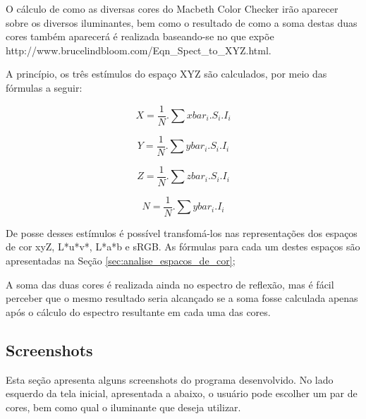 \par
O cálculo de como as diversas cores do Macbeth Color Checker irão
aparecer sobre os diversos iluminantes, bem como o resultado de como a soma
destas duas cores também aparecerá é realizada baseando-se no que expõe
{http://www.brucelindbloom.com/Eqn_Spect_to_XYZ.html}.

\par
A princípio, os três estímulos do espaço XYZ são calculados, por meio das
fórmulas a seguir:

\begin{equation}\label{eq:XYZfromSpectrum_X}
X=\frac{1}{N}.\sum{xbar_i.S_i.I_i}
\end{equation}

\begin{equation}\label{eq:XYZfromSpectrum_Y}
Y=\frac{1}{N}.\sum{ybar_i.S_i.I_i}
\end{equation}

\begin{equation}\label{eq:XYZfromSpectrum_Z}
Z=\frac{1}{N}.\sum{zbar_i.S_i.I_i}
\end{equation}

\begin{equation}\label{eq:XYZfromSpectrum_N}
N=\frac{1}{N}.\sum{ybar_i.I_i}
\end{equation}

\par
De posse desses estímulos é possível transfomá-los nas representações dos
espaços de cor xyZ, L*u*v*, L*a*b e sRGB. As fórmulas para cada um destes
espaços são apresentadas na Seção \ref{sec:analise_espacos_de_cor};

\par
A soma das duas cores é realizada ainda no espectro de reflexão, mas é fácil
perceber que o mesmo resultado seria alcançado se a soma fosse calculada apenas
após o cálculo do espectro resultante em cada uma das cores.

\subsection{Screenshots}
\par
Esta seção apresenta alguns screenshots do programa desenvolvido. No lado
esquerdo da tela inicial, apresentada a abaixo, o usuário pode escolher um par
de cores, bem como qual o iluminante que deseja utilizar.

